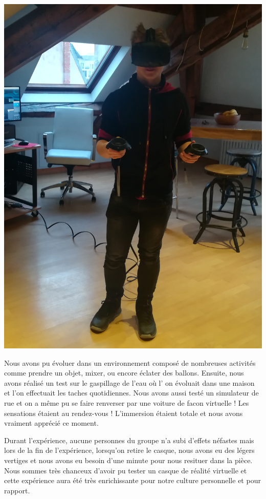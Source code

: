 \documentclass[12pt, a4paper]{report}
\begin{document}
\begin{center}
\includegraphics[scale=0.04]{nicolas.jpg}
\end{center}

 Nous avons pu évoluer dans un environnement composé de nombreuses activités comme prendre un objet, mixer, ou encore éclater des ballons. Ensuite, nous avons réalisé un test sur le gaspillage de l'eau où l' on évoluait dans une maison et l'on effectuait les taches quotidiennes. Nous avons aussi testé un simulateur de rue et on a même pu se faire renverser par une voiture de facon virtuelle ! Les sensations étaient au rendez-vous ! L'immersion étaient totale et nous avons vraiment apprécié ce moment.



 Durant l'expérience, aucune personnes du groupe n'a subi d'effets néfastes mais lors de la fin de l'expérience, lorsqu'on retire le casque, nous avons eu des légers vertiges et nous avons eu besoin d'une minute pour nous resituer dans la pièce. Nous sommes très chanceux d'avoir pu tester un casque de réalité virtuelle et cette expérience aura été très enrichissante pour notre culture personnelle et pour rapport.
\end{document}
